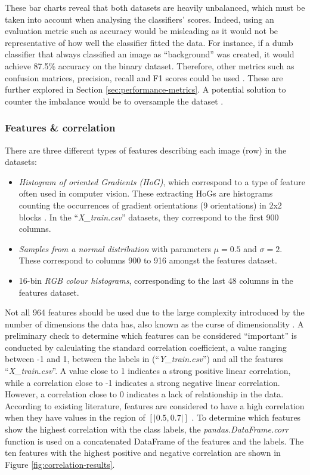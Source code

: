 \documentclass[letterpaper,12pt]{article}
\begin{document}
These bar charts reveal that both datasets are heavily unbalanced, which must be taken into account when analysing the classifiers' scores. Indeed, using an  evaluation metric such as accuracy would be misleading as it would not be representative of how well the classifier fitted the data. For instance, if a dumb classifier that always classified an image as ``background'' was created, it would achieve 87.5\% accuracy on the binary dataset. Therefore, other metrics such as confusion matrices, precision, recall and F1 scores could be used \cite{Geron2019}. These are further explored in Section \ref{sec:performance-metrics}. A potential solution to counter the imbalance would be to oversample the dataset \cite{becker2020}.

\subsubsection{Features \& correlation}

There are three different types of features describing each image (row) in the datasets:
\begin{itemize}
    \item \textit{Histogram of oriented Gradients (HoG)}, which correspond to a type of feature often used in computer vision. These extracting HoGs are histograms counting the occurrences of gradient orientations (9 orientations) in 2x2 blocks \cite{Dalal2005}. In the ``\textit{X\_train.csv}'' datasets, they correspond to the first 900 columns.
    \item \textit{Samples from a normal distribution} with parameters $\mu=0.5$ and $\sigma=2$. These correspond to columns 900 to 916 amongst the features dataset.
    \item 16-bin \textit{RGB colour histograms}, corresponding to the last 48 columns in the features dataset.
\end{itemize}

Not all 964 features should be used due to the large complexity introduced by the number of dimensions the data has, also known as the curse of dimensionality \cite{Geron2019}. A preliminary check to determine which features can be considered ``important'' is conducted by calculating the standard correlation coefficient, a value ranging between -1 and 1, between the labels in (``\textit{Y\_train.csv}'') and all the features ``\textit{X\_train.csv}''. A value close to 1 indicates a strong positive linear correlation, while a correlation close to -1 indicates a strong negative linear correlation. However, a correlation close to 0 indicates a lack of relationship in the data. According to existing literature, features are considered to have a high correlation when they have values in the region of $[|0.5,0.7|]$ \cite{Geron2019} \cite{Badr2019}. To determine which features show the highest correlation with the class labels, the \textit{pandas.DataFrame.corr} function is used on a concatenated DataFrame of the features and the labels. The ten features with the highest positive and negative correlation are shown in Figure \ref{fig:correlation-results}.
\end{document}
